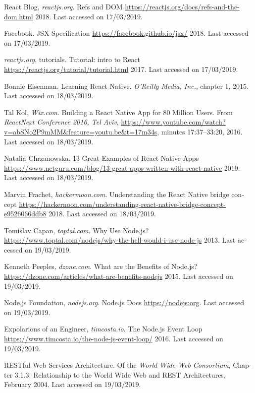 \begin{thebibliography}{1}
\bibitem{[REACT2]} {\textlatin{
{React Blog, {\em reactjs.org}}.
 Refs and DOM
\url{https://reactjs.org/docs/refs-and-the-dom.html}
  2018. Last accessed on 17/03/2019}}.  
  
\bibitem{[REACT3]} {\textlatin{
{Facebook}.
 JSX Specification
\url{https://facebook.github.io/jsx/}
  2018. Last accessed on 17/03/2019}}. 
  
\bibitem{[REACT4]} {\textlatin{
{{\em reactjs.org}, tutorials}.
 Tutorial: intro to React
\url{https://reactjs.org/tutorial/tutorial.html}
  2017. Last accessed on 17/03/2019}}. 
  
\bibitem{[RN1]} {\textlatin{
Bonnie Eisenman. 
Learning React Native.
{\em O'Reilly Media, Inc.}, chapter 1, 2015. Last accessed on 18/03/2019}}. 

\bibitem{[RN2]} {\textlatin{
Tal Kol, {\em Wix.com}. 
Building a React Native App for 80 Million Users.
From {\em ReactNext Conference 2016, Tel Aviv},
\url{https://www.youtube.com/watch?v=abSNo2P9mMM&feature=youtu.be&t=17m34s},
minutes 17:37--33:20, 2016. Last accessed on 18/03/2019}}.

\bibitem{[RN3]} {\textlatin{
{Natalia Chrzanowska}.
 13 Great Examples of React Native Apps
\url{https://www.netguru.com/blog/13-great-apps-written-with-react-native}
  2019. Last accessed on 18/03/2019}}.
  
\bibitem{[RN4]} {\textlatin{
{Marvin Frachet, {\em hackermoon.com}}.
Understanding the React Native bridge concept
\url{https://hackernoon.com/understanding-react-native-bridge-concept-e9526066ddb8}
  2018. Last accessed on 18/03/2019}}.
  
\bibitem{[NODE1]} {\textlatin{
{Tomislav Capan, {\em toptal.com}}.
Why Use Node.js?
\url{https://www.toptal.com/nodejs/why-the-hell-would-i-use-node-js}
  2013. Last accessed on 19/03/2019}}.
  
\bibitem{[NODE2]} {\textlatin{
{Kenneth Peeples, {\em dzone.com}}.
What are the Benefits of Node.js?
\url{https://dzone.com/articles/what-are-benefits-nodejs}
  2015. Last accessed on 19/03/2019}}.
  
\bibitem{[NODE3]} {\textlatin{
{Node,js Foundation, {\em nodejs.org}}.
Node.js Docs
\url{https://nodejs:org}. Last accessed on 19/03/2019}}.
  
\bibitem{[NODE4]} {\textlatin{
{Expolarions of an Engineer, {\em timcosta.io}}.
The Node.js Event Loop
\url{https://www.timcosta.io/the-node-js-event-loop/}
  2016. Last accessed on 19/03/2019}}.

\bibitem{[REST1]} {\textlatin{
RESTful Web Services Architecture.
Of the {\em World Wide Web Consortium}, Chapter 3.1.3: Relationship to the World Wide Web and REST Architectures, February 2004. Last accessed on 19/03/2019}}.


\end{thebibliography}

